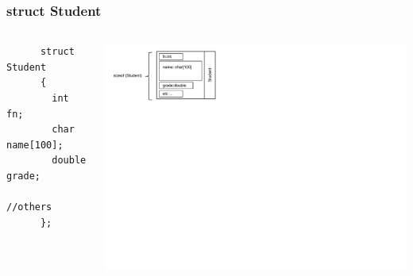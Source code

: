 \documentclass{beamer}
\begin{document}
\begin{frame}[fragile]
\frametitle{struct Student}



\begin{columns}[t]
  \begin{column}{0.5\textwidth}
      \vspace{-350px}
      \begin{flushleft}
      \begin{lstlisting}
      struct Student
      {
        int fn;
        char name[100];
        double grade;
        //others
      };
      \end{lstlisting}
      \end{flushleft} 
  \end{column}
  \begin{column}{0.5\textwidth}
  \includegraphics[width=16cm]{images/structstudent}
  \end{column}
\end{columns}


\end{frame}
\end{document}
